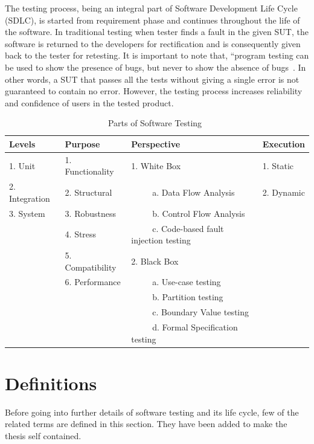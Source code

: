 The testing process, being an integral part of Software Development Life Cycle (SDLC), is started from requirement phase and continues throughout the life of the software. In traditional testing when tester finds a fault in the given SUT, the software is returned to the developers for rectification and is consequently given back to the tester for retesting. It is important to note that, ``program testing can be used to show the presence of bugs, but never to show the absence of bugs~\cite{Dijkstra1972}. In other words, a SUT that passes all the tests without giving a single error is not guaranteed to contain no error. However, the testing process increases reliability and confidence of users in the tested product. 


\begin{table}[ht]
\caption{Parts of Software Testing~\cite{adrion1982validation, chilenski1994applicability, gaudel2010software, richardson1992specification, tracey1998automated}} %
\smallskip
\centering %
\begin{tabular}{| l | l | l | l | } %
\hline

Levels 					&Purpose		 		& Perspective						& Execution 	\\
\hline
1. Unit					&1. Functionality			& 1. White Box						& 1. Static 	\\
2. Integration			&2. Structural			& ~~~~~a. Data Flow Analysis			& 2. Dynamic\\
3. System				&3. Robustness			& ~~~~~b. Control Flow Analysis		&			\\
						&4. Stress				& ~~~~~c. Code-based fault injection testing &			\\
						&5. Compatibility			&2. Black Box						&			\\
						&6. Performance			& ~~~~~a. Use-case testing			&			\\
						&						& ~~~~~b. Partition testing			&			\\
						&						& ~~~~~c. Boundary Value testing		&			\\
						&						& ~~~~~d. Formal Specification testing	&			\\



\hline %
\end{tabular}
\bigskip
\label{table:softwareTestingParts} %
\end{table}

\section{Definitions}
Before going into further details of software testing and its life cycle, few of the related terms are defined in this section. They have been added to make the thesis self contained.

